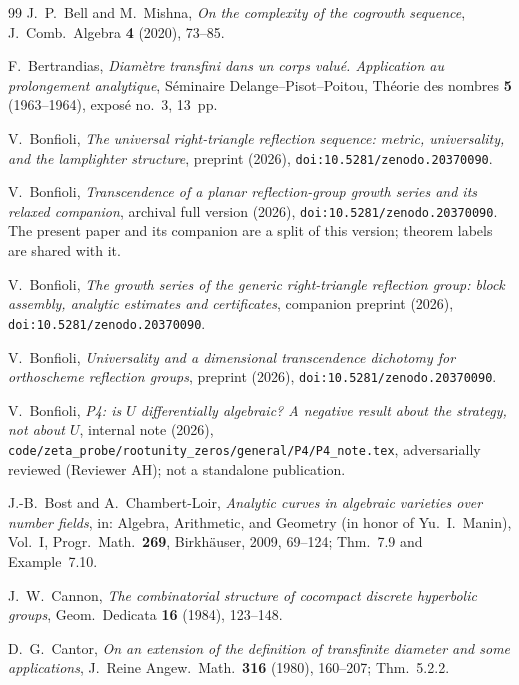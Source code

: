 \documentclass[11pt]{article}
\theoremstyle{plain}
\theoremstyle{definition}
\theoremstyle{remark}
\theoremstyle{plain}\newtheorem*{maintheorem}{Main Theorem}
\begin{document}
\begin{thebibliography}{99}
 J.~P.~Bell and M.~Mishna, \emph{On the complexity of the cogrowth
sequence}, J.~Comb.\ Algebra \textbf{4} (2020), 73--85.

 F.~Bertrandias, \emph{Diam\`etre transfini dans un corps valu\'e.
Application au prolongement analytique}, S\'eminaire Delange--Pisot--Poitou, Th\'eorie des
nombres \textbf{5} (1963--1964), expos\'e no.~3, 13~pp.

 V.~Bonfioli, \emph{The universal right-triangle reflection sequence:
metric, universality, and the lamplighter structure}, preprint (2026),
\texttt{doi:10.5281/zenodo.20370090}.

 V.~Bonfioli, \emph{Transcendence of a planar reflection-group growth
series and its relaxed companion}, archival full version (2026), \texttt{doi:10.5281/zenodo.20370090}.
The present paper and its companion are a split of this version; theorem labels are shared with it.

 V.~Bonfioli, \emph{The growth series of the generic right-triangle
reflection group: block assembly, analytic estimates and certificates}, companion preprint (2026),
\texttt{doi:10.5281/zenodo.20370090}.

 V.~Bonfioli, \emph{Universality and a dimensional transcendence dichotomy
for orthoscheme reflection groups}, preprint (2026), \texttt{doi:10.5281/zenodo.20370090}.

 V.~Bonfioli, \emph{P4: is $U$ differentially algebraic? A negative result
about the strategy, not about $U$}, internal note (2026),
\texttt{code/zeta\_probe/rootunity\_zeros/general/P4/P4\_note.tex}, adversarially reviewed
(Reviewer AH); not a standalone publication.

 J.-B.~Bost and A.~Chambert-Loir, \emph{Analytic curves in algebraic
varieties over number fields}, in: Algebra, Arithmetic, and Geometry (in honor of Yu.~I.~Manin),
Vol.~I, Progr.\ Math.~\textbf{269}, Birkh\"auser, 2009, 69--124; Thm.~7.9 and Example~7.10.

 J.~W.~Cannon, \emph{The combinatorial structure of cocompact discrete
hyperbolic groups}, Geom.\ Dedicata \textbf{16} (1984), 123--148.

 D.~G.~Cantor, \emph{On an extension of the definition of transfinite
diameter and some applications}, J.~Reine Angew.\ Math.\ \textbf{316} (1980), 160--207;
Thm.~5.2.2.


\end{thebibliography}
\end{document}
